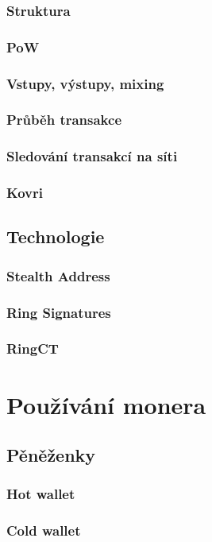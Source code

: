 \documentclass[
  printed, %
  table,   %
  nolof,     %
  nolot,     %
           oneside, color
]{fithesis3}
\begin{document}
\subsection{Struktura}
\subsection{PoW}
\subsection{Vstupy, výstupy, mixing}
\subsection{Průběh transakce}
\subsection{Sledování transakcí na síti}
\subsection{Kovri}
\section{Technologie}
\subsection{Stealth Address}
\label{sec:stealthaddresses} 
\subsection{Ring Signatures}
\label{sec:ringsignatures}
\subsection{RingCT}
\label{sec:ringct}
\chapter{Používání monera}
\section{Pěněženky}
\subsection{Hot wallet}
\subsection{Cold wallet}
\end{document}
